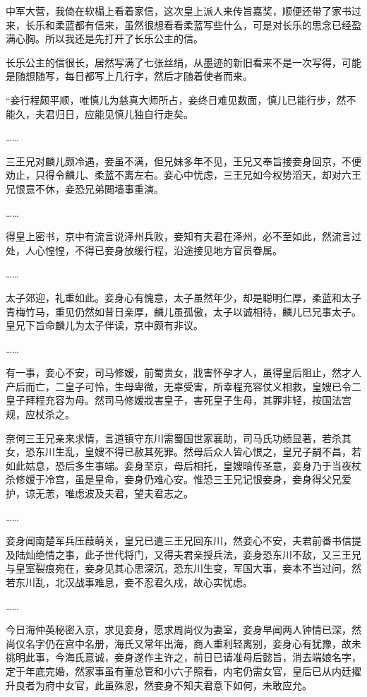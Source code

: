 中军大营，我倚在软榻上看着家信，这次皇上派人来传旨嘉奖，顺便还带了家书过来，长乐和柔蓝都有信来，虽然很想看看柔蓝写些什么，可是对长乐的思念已经盈满心胸。所以我还是先打开了长乐公主的信。

长乐公主的信很长，居然写满了七张丝绢，从墨迹的新旧看来不是一次写得，可能是随想随写，每日都写上几行字，然后才随着使者而来。

“妾行程颇平顺，唯慎儿为慈真大师所占，妾终日难见数面，慎儿已能行步，然不能久，夫君归日，应能见慎儿独自行走矣。

……

三王兄对麟儿颇冷遇，妾虽不满，但兄妹多年不见，王兄又奉旨接妾身回京，不便劝止，只得令麟儿、柔蓝不离左右。妾心中忧虑，三王兄如今权势滔天，却对六王兄恨意不休，妾恐兄弟閲墙事重演。

……

得皇上密书，京中有流言说泽州兵败，妾知有夫君在泽州，必不至如此，然流言过处，人心惶惶，不得已妾身放缓行程，沿途接见地方官员眷属。

……

太子郊迎，礼重如此。妾身心有愧意，太子虽然年少，却是聪明仁厚，柔蓝和太子青梅竹马，重见仍然如昔日亲厚，麟儿虽孤傲，太子以诚相待，麟儿已兄事太子。皇兄下旨命麟儿为太子伴读，京中颇有非议。

……

有一事，妾心不安，司马修嫒，前蜀贵女，戕害怀孕才人，虽得皇后阻止，然才人产后而亡，二皇子可怜，生母卑微，无辜受害，所幸程充容仗义相救，皇嫂已令二皇子拜程充容为母。然司马修嫒戕害皇子，害死皇子生母，其罪非轻，按国法宫规，应杖杀之。

奈何三王兄亲来求情，言道镇守东川需蜀国世家襄助，司马氏功绩显著，若杀其女，恐东川生乱，皇嫂不得已赦其死罪。然母后众人皆心恨之，皇兄子嗣不昌，若如此姑息，恐后多生事端。妾身至京，母后相托，皇嫂暗传圣意，妾身乃于当夜杖杀修嫒于冷宫，虽是皇命，妾身仍难心安。惟恐三王兄记恨妾身，妾身得父兄爱护，谅无恙，唯虑波及夫君，望夫君志之。

……

妾身闻南楚军兵压葭萌关，皇兄已遣三王兄回东川，然妾心不安，夫君前番书信提及陆灿绝情之事，此子世代将门，又得夫君亲授兵法，妾身恐东川不敌，又三王兄与皇室裂痕宛在，妾身见其心思深沉，恐东川生变，军国大事，妾本不当过问，然若东川乱，北汉战事难息，妾不忍君久戍，故心实忧虑。

……

今日海仲英秘密入京，求见妾身，愿求周尚仪为妻室，妾身早闻两人钟情已深，然尚仪名字仍在宫中名册，海氏又常年出海，商人重利轻离别，妾身心有犹豫，故未挑明此事，今海氏意诚，妾身遂作主许之，前日已请准母后懿旨，消去端娘名字，定于年底完婚，然家事虽有董总管和小六子照看，内宅仍需女官，皇后已从内廷擢升良者为府中女官，此虽殊恩，然妾身不知夫君意下如何，未敢应允。

